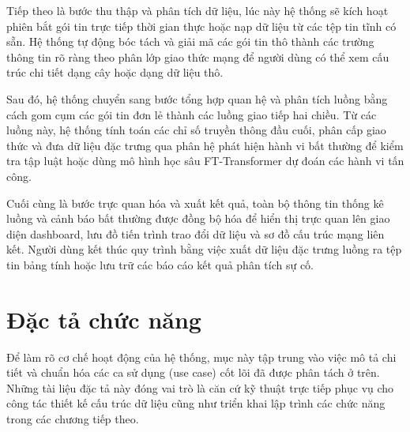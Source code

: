 \documentclass[../DoAn.tex]{subfiles}
\begin{document}
Tiếp theo là bước thu thập và phân tích dữ liệu, lúc này hệ thống sẽ kích hoạt phiên bắt gói tin trực tiếp thời gian thực hoặc nạp dữ liệu từ các tệp tin tĩnh có sẵn. Hệ thống tự động bóc tách và giải mã các gói tin thô thành các trường thông tin rõ ràng theo phân lớp giao thức mạng để người dùng có thể xem cấu trúc chi tiết dạng cây hoặc dạng dữ liệu thô.

Sau đó, hệ thống chuyển sang bước tổng hợp quan hệ và phân tích luồng bằng cách gom cụm các gói tin đơn lẻ thành các luồng giao tiếp hai chiều. Từ các luồng này, hệ thống tính toán các chỉ số truyền thông đầu cuối, phân cấp giao thức và đưa dữ liệu đặc trưng qua phân hệ phát hiện hành vi bất thường để kiểm tra tập luật hoặc dùng mô hình học sâu FT-Transformer dự đoán các hành vi tấn công.

Cuối cùng là bước trực quan hóa và xuất kết quả, toàn bộ thông tin thống kê luồng và cảnh báo bất thường được đồng bộ hóa để hiển thị trực quan lên giao diện dashboard, lưu đồ tiến trình trao đổi dữ liệu và sơ đồ cấu trúc mạng liên kết. Người dùng kết thúc quy trình bằng việc xuất dữ liệu đặc trưng luồng ra tệp tin bảng tính hoặc lưu trữ các báo cáo kết quả phân tích sự cố.

\section{Đặc tả chức năng}
Để làm rõ cơ chế hoạt động của hệ thống, mục này tập trung vào việc mô tả chi tiết và chuẩn hóa các ca sử dụng (use case) cốt lõi đã được phân tách ở trên. Những tài liệu đặc tả này đóng vai trò là căn cứ kỹ thuật trực tiếp phục vụ cho công tác thiết kế cấu trúc dữ liệu cũng như triển khai lập trình các chức năng trong các chương tiếp theo.
\end{document}
